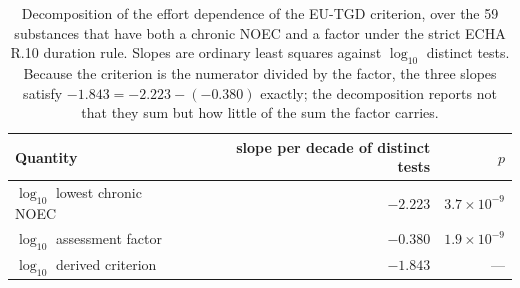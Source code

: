 \begin{table}[htbp]\centering\scriptsize\setlength{\tabcolsep}{2.4pt}
\caption{Decomposition of the effort dependence of the EU-TGD criterion, over the 59 substances that have both a chronic \textsf{NOEC} and a factor under the strict ECHA R.10 duration rule. Slopes are ordinary least squares against $\log_{10}$ distinct tests. Because the criterion is the numerator divided by the factor, the three slopes satisfy $-1.843 = -2.223 - (-0.380)$ exactly; the decomposition reports not that they sum but how little of the sum the factor carries.}
\label{tab:afdec}
\begin{tabular}{@{}l r r@{}}\toprule
Quantity & slope per decade of distinct tests & $p$ \\\midrule
$\log_{10}$ lowest chronic \textsf{NOEC} & $-2.223$ & $3.7\times10^{-9}$ \\
$\log_{10}$ assessment factor            & $-0.380$ & $1.9\times10^{-9}$ \\
$\log_{10}$ derived criterion            & $-1.843$ & --- \\
\bottomrule\end{tabular}\end{table}
